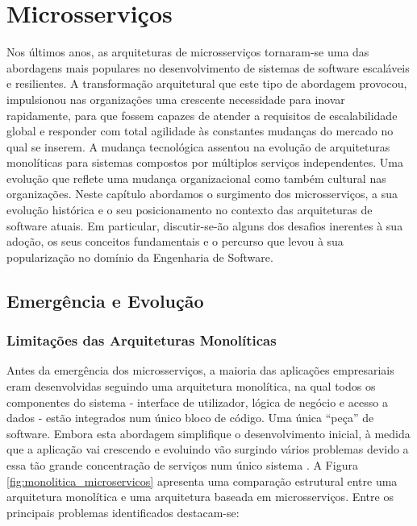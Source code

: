 \chapter{Microsserviços}

Nos últimos anos, as arquiteturas de microsserviços tornaram-se uma das abordagens mais populares no desenvolvimento de sistemas de software escaláveis e resilientes. A transformação arquitetural que este tipo de abordagem provocou, impulsionou nas organizações uma crescente necessidade para inovar rapidamente, para que fossem capazes de atender a requisitos de escalabilidade global e responder com total agilidade às constantes mudanças do mercado no qual se inserem. A mudança tecnológica assentou na evolução de arquiteturas monolíticas para sistemas compostos por múltiplos serviços independentes. Uma evolução que reflete uma mudança organizacional como também cultural nas organizações. Neste capítulo abordamos o surgimento dos microsserviços, a sua evolução histórica e o seu posicionamento no contexto das arquiteturas de software atuais. Em particular, discutir-se-ão alguns dos desafios inerentes à sua adoção, os seus conceitos fundamentais e o percurso que levou à sua popularização no domínio da Engenharia de Software.

\section{Emergência e Evolução}

\subsection{Limitações das Arquiteturas Monolíticas}

Antes da emergência dos microsserviços, a maioria das aplicações empresariais eram desenvolvidas seguindo uma arquitetura monolítica, na qual todos os componentes do sistema - interface de utilizador, lógica de negócio e acesso a dados - estão integrados num único bloco de código. Uma única “peça” de software. Embora esta abordagem simplifique o desenvolvimento inicial, à medida que a aplicação vai crescendo e evoluindo vão surgindo vários problemas devido a essa tão grande concentração de serviços num único sistema \cite{Villamizar2015}. A Figura \ref{fig:monolitica_microservicos} apresenta uma comparação estrutural entre uma arquitetura monolítica e uma arquitetura baseada em microsserviços. Entre os principais problemas identificados destacam-se:

